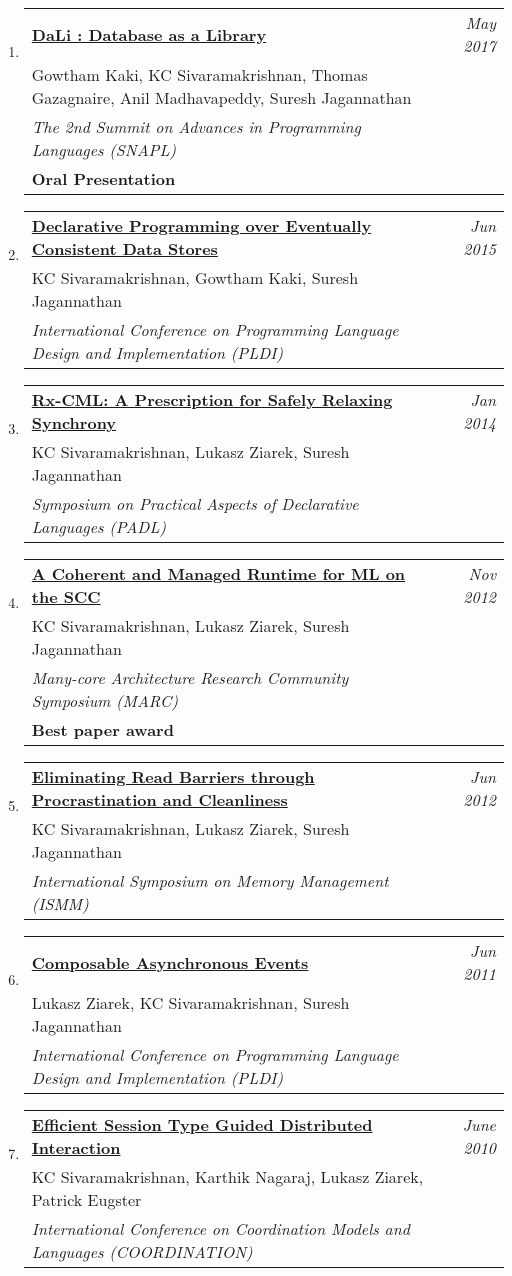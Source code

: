 \documentclass[10pt]{article}
\makeatletter
\newcommand{\lbar}[1]{{\color{#1}\ding{118}}\hspace*{2pt}}
\newenvironment{benumerate}[2]{
    \let\oldItem\item
    \def\item{\addtocounter{enumi}{-2}\oldItem}
    \begin{enumerate}[#2] \itemsep3pt
    \setcounter{enumi}{#1}
    \addtocounter{enumi}{1}}
  {\end{enumerate}}
\newenvironment{publication}[5]
{ \item
  \begin{tabular*}{7.5in}{p{6.3in}@{\extracolsep{\fill}}r}
    \href{#1}{\textbf{#2}} & \textit{#3}\\ #4 &\\ \textit{#5}&\\
  \end{tabular*}
} {}
\newenvironment{publicationNote}[6]
{ \item
  \begin{tabular*}{7.5in}{p{6.3in}@{\extracolsep{\fill}}r}
    \href{#1}{\textbf{#2}} & \textit{#3}\\ #4 &\\ \textit{#5}\\ \textbf{#6} \\
  \end{tabular*}
} {}
\newenvironment{region}[3]{%
  \vspace*{0.5ex}
  {\scalebox{1.4}{\textbf{#1}}}
  \begin{benumerate}{#3}{\color{RoyalBlue}#2}}
  {\end{benumerate}\vspace{0.8ex}}
\makeatother
\begin{document}
\begin{region} {\lbar{purple}Conference Publications}{{C}1}{8}
	\begin{publicationNote} {http://kcsrk.info/papers/dali_snapl17.pdf}
		{DaLi : Database as a Library}
		{May 2017} {Gowtham Kaki, KC Sivaramakrishnan, Thomas Gazagnaire, Anil Madhavapeddy, Suresh Jagannathan}
		{The 2nd Summit on Advances in Programming Languages (SNAPL)}
		{Oral Presentation}
	\end{publicationNote}

	\begin{publication} {http://kcsrk.info/papers/quelea_pldi15.pdf}
		{Declarative Programming over Eventually Consistent Data Stores}
		{Jun 2015} {KC Sivaramakrishnan, Gowtham Kaki, Suresh Jagannathan}
		{International Conference on Programming Language Design and Implementation (PLDI)}
	\end{publication}

	\begin{publication}{http://kcsrk.info/papers/rxcml_padl14.pdf}
		{Rx-CML: A Prescription for Safely Relaxing Synchrony}
		{Jan 2014}{KC Sivaramakrishnan, Lukasz Ziarek, Suresh Jagannathan}
		{Symposium on Practical Aspects of Declarative Languages (PADL)}
	\end{publication}

	\begin{publicationNote}{http://kcsrk.info/papers/mmscc_marc12.pdf}
		{A Coherent and Managed Runtime for ML on the SCC}
		{Nov 2012}{KC Sivaramakrishnan, Lukasz Ziarek, Suresh Jagannathan}
		{Many-core Architecture Research Community Symposium (MARC)}
		{Best paper award}
	\end{publicationNote}

	\begin{publication}{http://kcsrk.info/papers/mmgc_ismm12.pdf}
		{Eliminating Read Barriers through Procrastination and Cleanliness}
		{Jun 2012}{KC Sivaramakrishnan, Lukasz Ziarek, Suresh Jagannathan}
		{International Symposium on Memory Management (ISMM)}
	\end{publication}

	\begin{publication}{http://kcsrk.info/papers/acml_pldi11.pdf}
		{Composable Asynchronous Events}
		{Jun 2011}{Lukasz Ziarek, KC Sivaramakrishnan, Suresh Jagannathan}
		{International Conference on Programming Language Design and Implementation (PLDI)}
	\end{publication}

	\begin{publication}{http://kcsrk.info/papers/sting_coordination10.pdf}
		{Efficient Session Type Guided Distributed Interaction}
		{June 2010}{KC Sivaramakrishnan, Karthik Nagaraj, Lukasz Ziarek, Patrick Eugster}
		{International Conference on Coordination Models and Languages (COORDINATION)}
	\end{publication}


\end{region}
\end{document}
